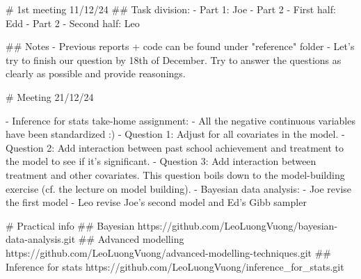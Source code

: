 \documentclass{article}
\begin{document}
\begin{markdown}
# 1st meeting 11/12/24
## Task division:
- Part 1: Joe
- Part 2 - First half: Edd
- Part 2 - Second half: Leo

## Notes
- Previous reports + code can be found under "reference" folder
- Let's try to finish our question by 18th of December. Try to answer the questions as clearly as possible and provide reasonings.

# Meeting 21/12/24

- Inference for stats take-home assignment:
  - All the negative continuous variables have been standardized :)
  - Question 1: Adjust for all covariates in the model.
  - Question 2: Add interaction between past school achievement and treatment to the model to see if it's significant.
  - Question 3: Add interaction between treatment and other covariates. This question boils down to the model-building exercise (cf. the lecture on model building).
- Bayesian data analysis:
  - Joe revise the first model 
  - Leo revise Joe's second model and Ed's Gibb sampler

# Practical info
## Bayesian
https://github.com/LeoLuongVuong/bayesian-data-analysis.git
## Advanced modelling
https://github.com/LeoLuongVuong/advanced-modelling-techniques.git
## Inference for stats
https://github.com/LeoLuongVuong/inference_for_stats.git

\end{markdown}
\end{document}
